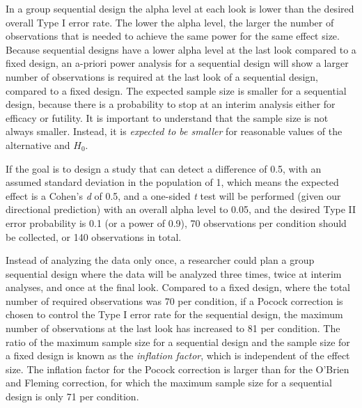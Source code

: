 \documentclass[
  english,
  ,man,floatsintext]{apa6}
\begin{document}
In a group sequential design the alpha level at each look is lower than the desired overall Type I error rate. The lower the alpha level, the larger the number of observations that is needed to achieve the same power for the same effect size. Because sequential designs have a lower alpha level at the last look compared to a fixed design, an a-priori power analysis for a sequential design will show a larger number of observations is required at the last look of a sequential design, compared to a fixed design. The expected sample size is smaller for a sequential design, because there is a probability to stop at an interim analysis either for efficacy or futility. It is important to understand that the sample size is not always smaller. Instead, it is \emph{expected to be smaller} for reasonable values of the alternative and \(H_0\).

If the goal is to design a study that can detect a difference of 0.5, with an assumed standard deviation in the population of 1, which means the expected effect is a Cohen's \emph{d} of 0.5, and a one-sided \emph{t} test will be performed (given our directional prediction) with an overall alpha level to 0.05, and the desired Type II error probability is 0.1 (or a power of 0.9), 70 observations per condition should be collected, or 140 observations in total.

Instead of analyzing the data only once, a researcher could plan a group sequential design where the data will be analyzed three times, twice at interim analyses, and once at the final look. Compared to a fixed design, where the total number of required observations was 70 per condition, if a Pocock correction is chosen to control the Type I error rate for the sequential design, the maximum number of observations at the last look has increased to 81 per condition. The ratio of the maximum sample size for a sequential design and the sample size for a fixed design is known as the \emph{inflation factor}, which is independent of the effect size. The inflation factor for the Pocock correction is larger than for the O'Brien and Fleming correction, for which the maximum sample size for a sequential design is only 71 per condition.
\end{document}
